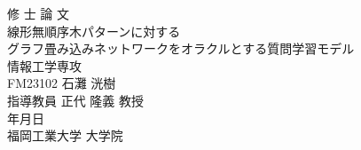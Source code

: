 \documentclass[10.5pt, a4paper]{jreport} %
\theoremstyle{definition}
\newcommand{\todayYMD}{\number\year 年\number\month 月\number\day 日}
\begin{document}
\begin{titlepage}
  \begin{center}
    {\LARGE 修  士  論  文}\\
    \vspace{20truemm}
    {\Huge 線形無順序木パターンに対する\\グラフ畳み込みネットワークをオラクルとする質問学習モデル}\\
    \vspace{80truemm}
    {\LARGE 情報工学専攻}\\
    \vspace{10truemm}
    {\LARGE FM23102  石灘 洸樹}\\
    \vspace{10truemm}
    {\LARGE 指導教員  正代 隆義 教授}\\
    \vspace{20truemm}
    {\LARGE \todayYMD}
    \vspace{10truemm}\\
    {\LARGE 福岡工業大学 大学院}
  \end{center}
\end{titlepage}




\setcounter{tocdepth}{2} %
\setcounter{page}{1}
\pagestyle{plain}
\setlength{\footskip}{10mm}
\tableofcontents
\pagebreak
\end{document}

